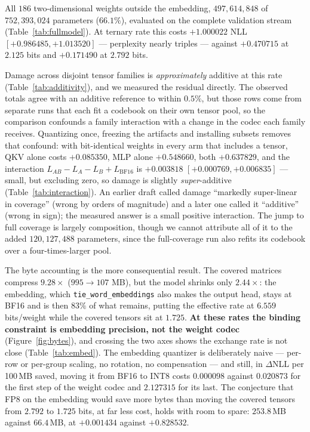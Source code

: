 \documentclass[11pt]{article}
\begin{document}
All $186$ two-dimensional weights outside the embedding, $497{,}614{,}848$ of
$752{,}393{,}024$ parameters ($66.1\%$), evaluated on the complete validation
stream (Table~\ref{tab:fullmodel}). At ternary rate this costs $+1.000022$ NLL
$[+0.986485,+1.013520]$ --- perplexity nearly triples --- against $+0.470715$ at
$2.125$ bits and $+0.171490$ at $2.792$ bits.





Damage across disjoint tensor families is \emph{approximately} additive at this
rate (Table~\ref{tab:additivity}), and we measured the residual directly. The
observed totals agree with an additive reference to within $0.5\%$, but those
rows come from separate runs that each fit a codebook on their own tensor pool,
so the comparison confounds a family interaction with a change in the codec each
family receives. Quantizing once, freezing the artifacts and installing subsets
removes that confound: with bit-identical weights in every arm that includes a
tensor, QKV alone costs $+0.085350$, MLP alone $+0.548660$, both $+0.637829$,
and the interaction $L_{AB}-L_A-L_B+L_{\mathrm{BF16}}$ is $+0.003818$
$[+0.000769,+0.006835]$ --- small, but excluding zero, so damage is slightly
\emph{super}-additive (Table~\ref{tab:interaction}). An earlier draft called damage ``markedly super-linear in
coverage'' (wrong by orders of magnitude) and a later one called it ``additive''
(wrong in sign); the measured answer is a small positive interaction. The jump
to full coverage is largely composition, though we cannot attribute all of it to
the added $120{,}127{,}488$ parameters, since the full-coverage run also refits
its codebook over a four-times-larger pool.

The byte accounting is the more consequential result. The covered matrices
compress $9.28\times$ ($995 \to 107$ MB), but the model shrinks only
$2.44\times$: the embedding, which \texttt{tie\_word\_embeddings} also makes the
output head, stays at BF16 and is then $83\%$ of what remains, putting the
effective rate at $6.559$ bits/weight while the covered tensors sit at $1.725$.
\textbf{At these rates the binding constraint is embedding precision, not the
weight codec} (Figure~\ref{fig:bytes}), and crossing the two axes shows the exchange rate is not close
(Table~\ref{tab:embed}). The embedding quantizer is deliberately naive --- per-row
or per-group scaling, no rotation, no compensation --- and still, in $\Delta$NLL
per 100\,MB saved, moving it from BF16 to INT8 costs $0.000098$ against
$0.020873$ for the first step of the weight codec and $2.127315$ for its last.
The conjecture that FP8 on the embedding would save more bytes than moving the
covered tensors from $2.792$ to $1.725$ bits, at far less cost, holds with room
to spare: $253.8$\,MB against $66.4$\,MB, at $+0.001434$ against $+0.828532$.
\end{document}

